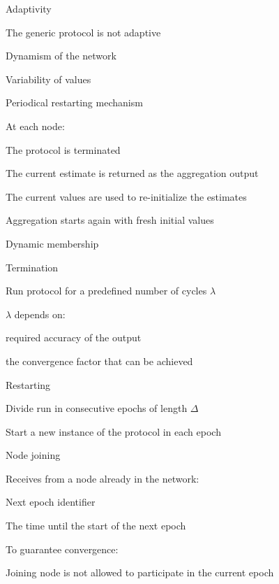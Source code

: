 \begin{frame}{Adaptivity}
	
\BIL
\item The generic protocol is not adaptive
	\BI
	\item Dynamism of the network
	\item Variability of values
	\EI
\item Periodical \alert{restarting} mechanism
	\BI
	\item  At each node:
		\BI
		\item The protocol is terminated	
		\item The current estimate is returned as the aggregation output
		\item The current values are used to re-initialize the estimates
		\item Aggregation starts again with fresh initial values
		\EI
	\EI
\EIL

\end{frame}

\begin{frame}{Dynamic membership}
	
\BIL
\item \alert{Termination} 
	\BI
	\item Run protocol for a predefined number of cycles $\lambda$
	\item $\lambda$ depends on:
		\BI
		\item required accuracy of the output
		\item the convergence factor that can be achieved
		\EI
	\EI
\item \alert{Restarting}
	\BI
	\item Divide run in consecutive epochs of length $\Delta$
	\item Start a new instance of the protocol in each epoch
	\EI
\item \alert{Node joining}
	\BI
	\item Receives from a node already in the network:
		\BI
		\item Next epoch identifier
		\item The time until the start of the next epoch
		\EI
	\item To guarantee convergence:
		\BI
		\item Joining node is not allowed to participate in the current epoch	
		\EI
	\EI
\EIL	
\end{frame}

